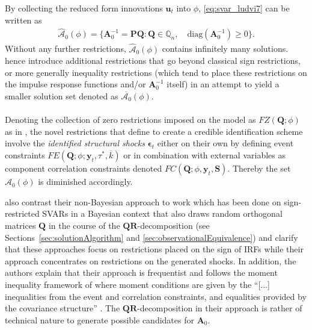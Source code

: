 \documentclass[a4paper,11pt,listof=nochaptergap,oneside,pointednumbers,bibtotoc,bigheadings,liststotoc,hidelinks]{scrbook}
\theoremstyle{mysatz}
\theoremstyle{mydefinition}
\theoremstyle{mytheorem}
\theoremstyle{mybemerkung}
\let\oldhat\hat
\newcommand{\vect}[1]{\boldsymbol{\mathbf{#1}}}
\newcommand{\hatt}[1]{\oldhat{\boldsymbol{\mathbf{#1}}}}
\begin{document}
By collecting the reduced form innovations $\vect{u}_t$ into $\phi$, \ref{eq:svar_ludvi7} can be written as 
\begin{equation} \label{eq:svar_ludvi8}
\begin{split}
 			\hatt{\mathcal{A}}_0(\phi) = \{\vect{A}_0^{-1} = \vect{P}\vect{Q}: \vect{Q} \in \mathbb{Q}_n, \quad \text{diag}(\vect{A}_0^{-1}) \geq 0\}.
\end{split}								
\end{equation}
Without any further restrictions, $\hatt{\mathcal{A}}_0(\phi)$ contains infinitely many solutions. \citet{ludvigsonetal:18,ludvigsonetal:19} hence introduce additional restrictions that go beyond classical sign restrictions, or more generally inequality restrictions (which tend to place these restrictions on the impulse response functions and/or $\vect{A}_0^{-1}$ itself) in an attempt to yield a smaller solution set denoted as $\overline{\mathcal{A}_0}(\phi)$.\\
\\
Denoting the collection of zero restrictions imposed on the model as $FZ(\vect{Q}; \phi)$ as in \citet{rubioetal:10}, the novel restrictions that \citet{ludvigsonetal:18,ludvigsonetal:19} define to create a credible identification scheme involve the \textit{identified structural shocks} $\vect{\epsilon}_t$ either on their own by defining event constraints $FE(\vect{Q}; \phi; \vect{y}_t, \tau^*, \overline{k})$ or in combination with external variables as component correlation constraints denoted $FC(\vect{Q}; \phi, \vect{y}_t, \vect{S})$. Thereby the set $\hatt{\mathcal{A}}_0(\phi)$ is diminished accordingly.

\citet{ludvigsonetal:18,ludvigsonetal:19} also contrast their non-Bayesian approach to work which has been done on sign-restricted SVARs in a Bayesian context that also draws random orthogonal matrices $\vect{Q}$ in the course of the $\vect{QR}$-decomposition (see Sections~\ref{sec:solutionAlgorithm} and \ref{sec:observationalEquivalence}) and clarify that these approaches focus on restrictions placed on the sign of IRFs while their approach concentrates on restrictions on the generated shocks. In addition, the authors explain that their approach is frequentist and follows the moment inequality framework of \citet{andrewsandsoares:10} where moment conditions are given by the ``[...] inequalities from the event and correlation constraints, and equalities provided by the covariance structure'' \citet[p. 14]{ludvigsonetal:19}. The $\vect{QR}$-decomposition in their approach is rather of technical nature to generate possible candidates for $\vect{A}_0$.
\end{document}
